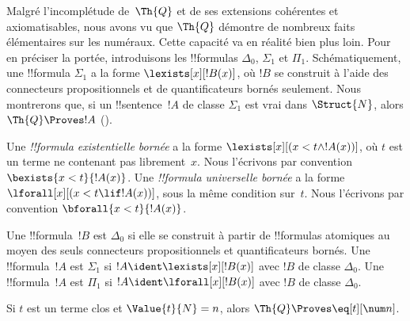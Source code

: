 \documentclass[../../../include/open-logic-section]{subfiles}
\begin{document}

Malgré l'incomplétude de~$\Th{Q}$ et de ses extensions
cohérentes et axiomatisables, nous avons vu que $\Th{Q}$
démontre de nombreux faits élémentaires sur les numéraux.
Cette capacité va en réalité bien plus loin. Pour en préciser
la portée, introduisons les !!{formula}s $\Delta_0$,
$\Sigma_1$ et $\Pi_1$. Schématiquement, une !!{formula}
$\Sigma_1$ a la forme $\lexists[x][!B(x)]$, où $!B$ se
construit à l'aide des connecteurs propositionnels et de
quantificateurs bornés seulement. Nous montrerons que, si un
!!{sentence}~$!A$ de classe $\Sigma_1$ est vrai dans
$\Struct{N}$, alors $\Th{Q}\Proves !A$
().

\begin{defn}
Une \emph{!!{formula} existentielle bornée} a la forme
$\lexists[x][(x<t\land !A(x))]$, où $t$ est un terme ne
contenant pas librement~$x$. Nous l'écrivons par convention
$\bexists{x<t}{!A(x)}$.
%
Une \emph{!!{formula} universelle bornée} a la forme
$\lforall[x][(x<t\lif !A(x))]$, sous la même condition
sur~$t$. Nous l'écrivons par convention
$\bforall{x<t}{!A(x)}$.
\end{defn}

\begin{defn}
Une !!{formula}~$!B$ est $\Delta_0$ si elle se construit à
partir de !!{formula}s atomiques au moyen des seuls
connecteurs propositionnels et quantificateurs bornés.
%
Une !!{formula}~$!A$ est $\Sigma_1$ si
$!A\ident\lexists[x][!B(x)]$ avec $!B$ de classe $\Delta_0$.
%
Une !!{formula}~$!A$ est $\Pi_1$ si
$!A\ident\lforall[x][!B(x)]$ avec $!B$ de classe $\Delta_0$.
\end{defn}

\begin{lem}
Si $t$ est un terme clos et $\Value{t}{N}=n$, alors
$\Th{Q}\Proves\eq[t][\num n]$.
\end{lem}
\end{document}
